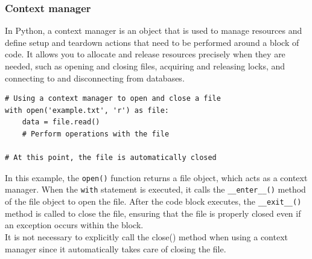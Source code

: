 \subsubsection{Context manager}
In Python, a context manager is an object that is used to manage resources and define setup and teardown actions that need to be performed around a block of code. It allows you to allocate and release resources precisely when they are needed, such as opening and closing files, acquiring and releasing locks, and connecting to and disconnecting from databases.

\begin{codebox}
\begin{verbatim}
# Using a context manager to open and close a file
with open('example.txt', 'r') as file:
    data = file.read()
    # Perform operations with the file

# At this point, the file is automatically closed
\end{verbatim}
\end{codebox}
In this example, the \texttt{open()} function returns a file object, which acts as a context manager. When the \texttt{with} statement is executed, it calls the \texttt{\_\_enter\_\_()} method of the file object to open the file. After the code block executes, the \texttt{\_\_exit\_\_()} method is called to close the file, ensuring that the file is properly closed even if an exception occurs within the block.\\

It is not necessary to explicitly call the close() method when using a context manager since it automatically takes care of closing the file.
